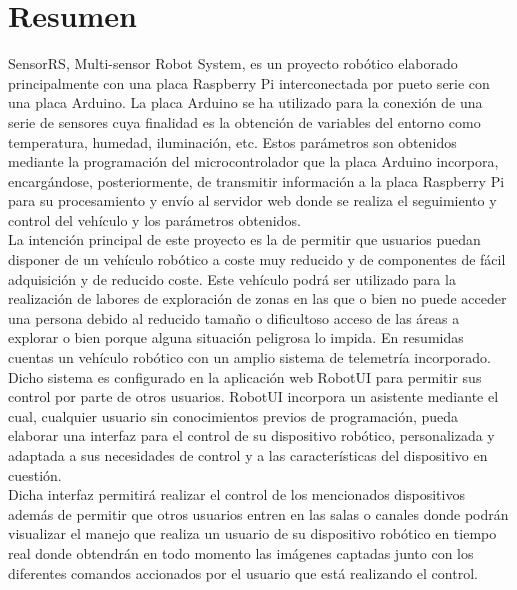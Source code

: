 

\section*{Resumen}
\label{resumen}

SensorRS, Multi-sensor Robot System, es un proyecto robótico elaborado principalmente con una placa Raspberry Pi interconectada por pueto serie con una placa Arduino. La placa Arduino
se ha utilizado para la conexión de una serie de sensores cuya finalidad es la obtención de variables del entorno como temperatura, humedad, iluminación, etc. Estos parámetros 
son obtenidos mediante la programación del microcontrolador que la placa Arduino incorpora, encargándose, posteriormente, de transmitir información a la placa Raspberry Pi
para su procesamiento y envío al servidor web donde se realiza el seguimiento y control del vehículo y los parámetros obtenidos.\\

La intención principal de este proyecto es la de permitir que usuarios puedan disponer de un vehículo robótico a coste muy reducido y de componentes de fácil adquisición y
de reducido coste. Este vehículo podrá ser utilizado para la realización de labores de exploración de zonas en las que o bien no puede acceder una persona debido al reducido tamaño o 
dificultoso acceso de las áreas a explorar o bien porque alguna situación peligrosa lo impida. En resumidas cuentas un vehículo robótico con un amplio sistema de telemetría incorporado.\\

Dicho sistema es configurado en la aplicación web RobotUI para permitir sus control por parte de otros usuarios. RobotUI incorpora un asistente mediante el cual, cualquier usuario 
sin conocimientos previos de programación, pueda elaborar una interfaz para el control de su dispositivo robótico, personalizada y adaptada a sus necesidades de control 
y a las características del dispositivo en cuestión.\\

Dicha interfaz permitirá realizar el control de los mencionados dispositivos además de permitir que otros usuarios entren en las salas o canales donde podrán visualizar el manejo 
que realiza un usuario de su dispositivo robótico en tiempo real donde obtendrán en todo momento las imágenes captadas junto con los diferentes comandos accionados por el usuario 
que está realizando el control.\\

